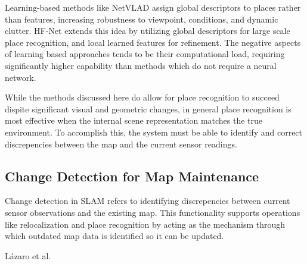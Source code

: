 Learning-based methods like NetVLAD \cite{arandjelovicNetVLADCNNArchitecture2016} assign global descriptors to places rather than features, increasing robustness to viewpoint, conditions, and dynamic clutter. HF-Net \cite{sarlinCoarseFineRobust2019} extends this idea by utilizing global descriptors for large scale place recognition, and local learned features for refinement. The negative aspects of learning based approaches tends to be their computational load, requiring significantly higher capability than methods which do not require a neural network.

While the methods discussed here do allow for place recognition to succeed dispite significant visual and geometric changes, in general place recognition is most effective when the internal scene representation matches the true environment. To accomplish this, the system must be able to identify and correct discrepencies between the map and the current sensor readings.

\subsection{Change Detection for Map Maintenance}

Change detection in SLAM refers to identifying discrepencies between current sensor observations and the existing map. This functionality supports operations like relocalization and place recognition by acting as the mechanism through which outdated map data is identified so it can be updated.




Lázaro et al.
